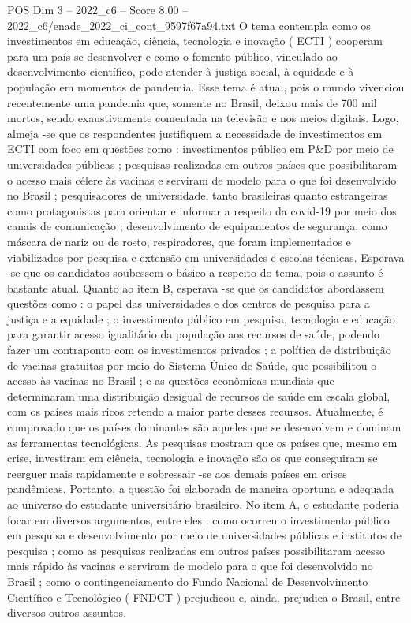 \begin{textsample}{POS Dim 3 – 2022\_c6 – Score 8.00 – 2022\_c6/enade\_2022\_ci\_cont\_9597f67a94.txt}
O tema contempla como os investimentos em educação, ciência, tecnologia e inovação ( ECTI ) cooperam para um país se desenvolver e como o fomento público, vinculado ao desenvolvimento científico, pode atender à justiça social, à equidade e à população em momentos de pandemia.
Esse tema é atual, pois o mundo vivenciou recentemente uma pandemia que, somente no Brasil, deixou mais de 700 mil mortos, sendo exaustivamente comentada na televisão e nos meios digitais.
Logo, almeja -se que os respondentes justifiquem a necessidade de investimentos em ECTI com foco em questões como : investimentos público em P\&D por meio de universidades públicas ; pesquisas realizadas em outros países que possibilitaram o acesso mais célere às vacinas e serviram de modelo para o que foi desenvolvido no Brasil ; pesquisadores de universidade, tanto brasileiras quanto estrangeiras como protagonistas para orientar e informar a respeito da covid-19 por meio dos canais de comunicação ; desenvolvimento de equipamentos de segurança, como máscara de nariz ou de rosto, respiradores, que foram implementados e viabilizados por pesquisa e extensão em universidades e escolas técnicas.
Esperava -se que os candidatos soubessem o básico a respeito do tema, pois o assunto é bastante atual.
Quanto ao item B, esperava -se que os candidatos abordassem questões como : o papel das universidades e dos centros de pesquisa para a justiça e a equidade ; o investimento público em pesquisa, tecnologia e educação para garantir acesso igualitário da população aos recursos de saúde, podendo fazer um contraponto com os investimentos privados ; a política de distribuição de vacinas gratuitas por meio do Sistema Único de Saúde, que possibilitou o acesso às vacinas no Brasil ; e as questões econômicas mundiais que determinaram uma distribuição desigual de recursos de saúde em escala global, com os países mais ricos retendo a maior parte desses recursos.
Atualmente, é comprovado que os países dominantes são aqueles que se desenvolvem e dominam as ferramentas tecnológicas.
As pesquisas mostram que os países que, mesmo em crise, investiram em ciência, tecnologia e inovação são os que conseguiram se reerguer mais rapidamente e sobressair -se aos demais países em crises pandêmicas.
Portanto, a questão foi elaborada de maneira oportuna e adequada ao universo do estudante universitário brasileiro.
No item A, o estudante poderia focar em diversos argumentos, entre eles : como ocorreu o investimento público em pesquisa e desenvolvimento por meio de universidades públicas e institutos de pesquisa ; como as pesquisas realizadas em outros países possibilitaram acesso mais rápido às vacinas e serviram de modelo para o que foi desenvolvido no Brasil ; como o contingenciamento do Fundo Nacional de Desenvolvimento Científico e Tecnológico ( FNDCT ) prejudicou e, ainda, prejudica o Brasil, entre diversos outros assuntos.

\end{textsample}
